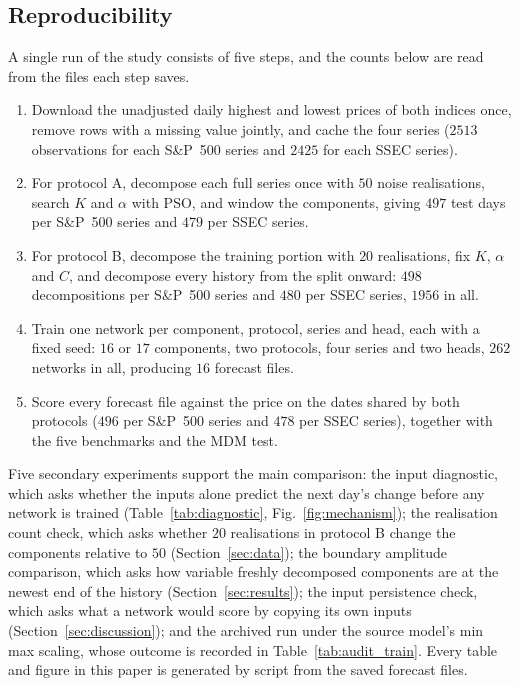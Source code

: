 \subsection{Reproducibility}
A single run of the study consists of five steps, and the counts below are
read from the files each step saves.
\begin{enumerate}
\item Download the unadjusted daily highest and lowest prices of both indices
once, remove rows with a missing value jointly, and cache the four series
($2513$ observations for each S\&P~500 series and $2425$ for each SSEC series).
\item For protocol A, decompose each full series once with $50$ noise
realisations, search $K$ and $\alpha$ with PSO, and window the components,
giving $497$ test days per S\&P~500 series and $479$ per SSEC series.
\item For protocol B, decompose the training portion with $20$ realisations,
fix $K$, $\alpha$ and $C$, and decompose every history from the split onward:
$498$ decompositions per S\&P~500 series and $480$ per SSEC series, $1956$ in
all.
\item Train one network per component, protocol, series and head, each with a
fixed seed: $16$ or $17$ components, two protocols, four series and two heads,
$262$ networks in all, producing $16$ forecast files.
\item Score every forecast file against the price on the dates shared by both
protocols ($496$ per S\&P~500 series and $478$ per SSEC series), together with
the five benchmarks and the MDM test.
\end{enumerate}
Five secondary experiments support the main comparison: the input diagnostic,
which asks whether the inputs alone predict the next day's change before any
network is trained (Table~\ref{tab:diagnostic}, Fig.~\ref{fig:mechanism}); the
realisation count check, which asks whether $20$ realisations in protocol B
change the components relative to $50$ (Section~\ref{sec:data}); the boundary
amplitude comparison, which asks how variable freshly decomposed components are
at the newest end of the history (Section~\ref{sec:results}); the input
persistence check, which asks what a network would score by copying its own
inputs (Section~\ref{sec:discussion}); and the archived run under the source
model's min max scaling, whose outcome is recorded in Table~\ref{tab:audit_train}.
Every table and figure in this paper is generated by script from the saved
forecast files.
